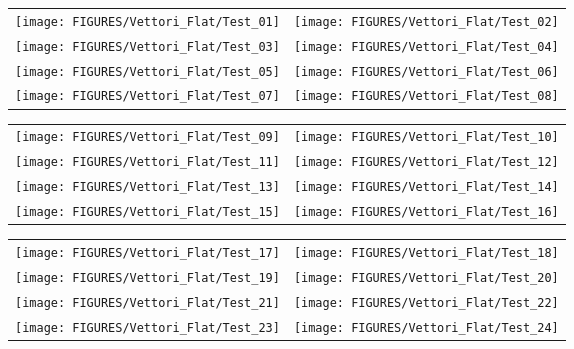 \begin{figure}[p]
\begin{tabular*}{\textwidth}{l@{\extracolsep{\fill}}r}
\texttt{[image: FIGURES/Vettori\_Flat/Test\_01]} &
\texttt{[image: FIGURES/Vettori\_Flat/Test\_02]} \\
\texttt{[image: FIGURES/Vettori\_Flat/Test\_03]} &
\texttt{[image: FIGURES/Vettori\_Flat/Test\_04]} \\
\texttt{[image: FIGURES/Vettori\_Flat/Test\_05]} &
\texttt{[image: FIGURES/Vettori\_Flat/Test\_06]} \\
\texttt{[image: FIGURES/Vettori\_Flat/Test\_07]} &
\texttt{[image: FIGURES/Vettori\_Flat/Test\_08]} \\
\end{tabular*}
\label{Vettori_Plume_Temperature}
\end{figure}

\begin{figure}[p]
\begin{tabular*}{\textwidth}{l@{\extracolsep{\fill}}r}
\texttt{[image: FIGURES/Vettori\_Flat/Test\_09]} &
\texttt{[image: FIGURES/Vettori\_Flat/Test\_10]} \\
\texttt{[image: FIGURES/Vettori\_Flat/Test\_11]} &
\texttt{[image: FIGURES/Vettori\_Flat/Test\_12]} \\
\texttt{[image: FIGURES/Vettori\_Flat/Test\_13]} &
\texttt{[image: FIGURES/Vettori\_Flat/Test\_14]} \\
\texttt{[image: FIGURES/Vettori\_Flat/Test\_15]} &
\texttt{[image: FIGURES/Vettori\_Flat/Test\_16]} \\
\end{tabular*}
\label{Vettori_2}
\end{figure}

\begin{figure}[p]
\begin{tabular*}{\textwidth}{l@{\extracolsep{\fill}}r}
\texttt{[image: FIGURES/Vettori\_Flat/Test\_17]} &
\texttt{[image: FIGURES/Vettori\_Flat/Test\_18]} \\
\texttt{[image: FIGURES/Vettori\_Flat/Test\_19]} &
\texttt{[image: FIGURES/Vettori\_Flat/Test\_20]} \\
\texttt{[image: FIGURES/Vettori\_Flat/Test\_21]} &
\texttt{[image: FIGURES/Vettori\_Flat/Test\_22]} \\
\texttt{[image: FIGURES/Vettori\_Flat/Test\_23]} &
\texttt{[image: FIGURES/Vettori\_Flat/Test\_24]} \\
\end{tabular*}
\label{Vettori_3}
\end{figure}

